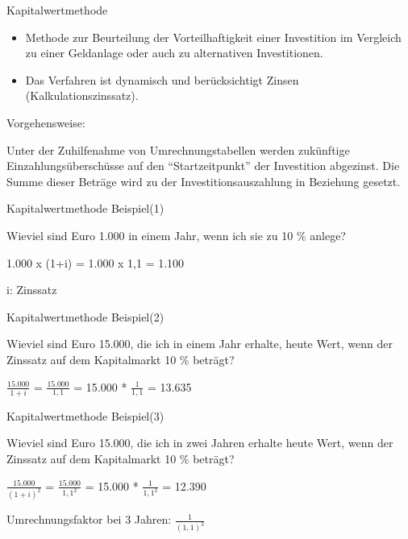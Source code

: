 \documentclass[12pt,ngerman,a4paper,ignorenonframetext,]{beamer}
\providecommand{\tightlist}{%
  \setlength{\itemsep}{0pt}\setlength{\parskip}{0pt}}
\begin{document}
\begin{frame}{Kapitalwertmethode}
\protect\hypertarget{kapitalwertmethode}{}

\begin{itemize}
\tightlist
\item
  Methode zur Beurteilung der Vorteilhaftigkeit einer Investition im
  Vergleich zu einer Geldanlage oder auch zu alternativen Investitionen.
\item
  Das Verfahren ist dynamisch und berücksichtigt Zinsen
  (Kalkulationszinssatz).
\end{itemize}

Vorgehensweise:

Unter der Zuhilfenahme von Umrechnungstabellen werden zukünftige
Einzahlungsüberschüsse auf den ``Startzeitpunkt'' der Investition
abgezinst. Die Summe dieser Beträge wird zu der Investitionsauszahlung
in Beziehung gesetzt.

\end{frame}

\begin{frame}{Kapitalwertmethode Beispiel(1)}
\protect\hypertarget{kapitalwertmethode-beispiel1}{}

Wieviel sind Euro 1.000 in einem Jahr, wenn ich sie zu 10 \% anlege?

1.000 x (1+i) = 1.000 x 1,1 = 1.100

i: Zinssatz

\end{frame}

\begin{frame}{Kapitalwertmethode Beispiel(2)}
\protect\hypertarget{kapitalwertmethode-beispiel2}{}

Wieviel sind Euro 15.000, die ich in einem Jahr erhalte, heute Wert,
wenn der Zinssatz auf dem Kapitalmarkt 10 \% beträgt?

\(\frac{ 15.000 }{ 1+i }\) = \(\frac{ 15.000 }{ 1,1 }\) = 15.000 *
\(\frac{ 1 }{ 1,1 }\) = 13.635

\end{frame}

\begin{frame}{Kapitalwertmethode Beispiel(3)}
\protect\hypertarget{kapitalwertmethode-beispiel3}{}

Wieviel sind Euro 15.000, die ich in zwei Jahren erhalte heute Wert,
wenn der Zinssatz auf dem Kapitalmarkt 10 \% beträgt?

\(\frac{ 15.000 }{(1+i)^{2} }\) = \(\frac{ 15.000 }{1,1^{2} }\) = 15.000
* \(\frac{ 1 }{1,1^{2} }\) = 12.390

Umrechnungsfaktor bei 3 Jahren: \(\frac{ 1 }{(1,1)^{3} }\)

\end{frame}
\end{document}
